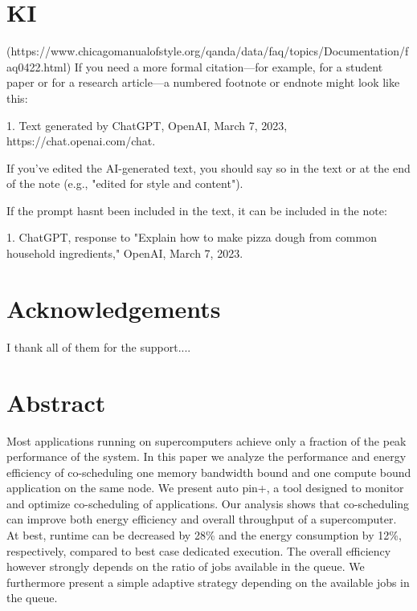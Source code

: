 \documentclass[a4paper, 11pt]{article}
\begin{document}

\clearpage
\pagestyle{plain}

\newpage

\section*{KI}
(https://www.chicagomanualofstyle.org/qanda/data/faq/topics/Documentation/faq0422.html)
If you need a more formal citation—for example, for a student paper or for a research article—a numbered footnote or endnote might look like this:

1. Text generated by ChatGPT, OpenAI, March 7, 2023, https://chat.openai.com/chat.

If you've edited the AI-generated text, you should say so in the text or at the end of the note (e.g., "edited for style and content").

If the prompt hasnt been included in the text, it can be included in the note:

1. ChatGPT, response to "Explain how to make pizza dough from common household ingredients," OpenAI, March 7, 2023.


\newpage

\section*{Acknowledgements}
I thank all of them for the support....



\newpage
\section*{Abstract}


Most applications running on supercomputers achieve only a fraction of the peak performance of the system. In this paper we analyze the performance and energy efficiency of co-scheduling one memory bandwidth bound and one compute bound application on the same node. We present auto pin+, a tool designed to monitor and optimize co-scheduling of applications. Our analysis shows that co-scheduling can improve both energy efficiency and overall throughput of a supercomputer. At best, runtime can be decreased by 28\% and the energy consumption by 12\%, respectively, compared to best case dedicated execution. The overall efficiency however strongly depends on the ratio of jobs available in the queue. We furthermore present a simple adaptive strategy depending on the available jobs in the queue.
\end{document}
